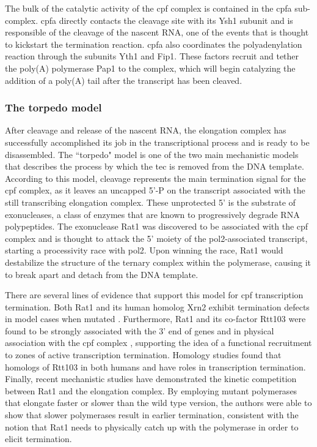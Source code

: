 The bulk of the catalytic activity of the \gls{cpf} complex is contained in the \gls{cpfa} sub-complex.
\gls{cpfa} directly contacts the cleavage site with its Ysh1 subunit and is responsible of the cleavage of the nascent RNA, one of the events that is thought to kickstart the termination reaction.
\gls{cpfa} also coordinates the polyadenylation reaction through the subunits Yth1 and Fip1. 
These factors recruit and tether the poly(A) polymerase Pap1 to the complex, which will begin catalyzing the addition of a poly(A) tail after the transcript has been cleaved.

\subsubsection{The torpedo model}

After cleavage and release of the nascent RNA, the elongation complex has successfully accomplished its job in the transcriptional process and is ready to be disassembled.
The ``torpedo" model is one of the two main mechanistic models that describes the process by which the \gls{tec} is removed from the DNA template.
According to this model, cleavage represents the main termination signal for the \gls{cpf} complex, as it leaves an uncapped 5'-P on the transcript associated with the still transcribing elongation complex.
These unprotected 5' is the substrate of \FtoT{} exonucleases, a class of enzymes that are known to progressively degrade RNA polypeptides.
The \FtoT{} exonuclease Rat1 was discovered to be associated with the \gls{cpf} complex and is thought to attack the 5' moiety of the \gls{pol2}-associated transcript, starting a processivity race with \gls{pol2}.
Upon winning the race, Rat1 would destabilize the structure of the ternary complex within the polymerase, causing it to break apart and detach from the DNA template.

There are several lines of evidence that support this model for \gls{cpf} transcription termination.
Both Rat1 and its human homolog Xrn2 exhibit termination defects in model cases when mutated \citep{kim:2004:yeast, west:2004:human}.
Furthermore, Rat1 and its co-factor Rtt103 were found to be strongly associated with the 3' end of genes and in physical association with the \gls{cpf} complex \citep{kim:2004:yeast,luo:2006:role}, supporting the idea of a functional recruitment to zones of active transcription termination.
Homology studies found that homologs of Rtt103 in both humans and \cele{} have roles in transcription termination\citep{morales:2014:kub5hera, cui:2008:genes}.
Finally, recent mechanistic studies \invivo{} have demonstrated the kinetic competition between Rat1 and the elongation complex. By employing mutant polymerases that elongate faster or slower than the wild type version, the authors were able to show that slower polymerases result in earlier termination, consistent with the notion that Rat1 needs to physically catch up with the polymerase in order to elicit termination\citep{fong:2015:effects}.

